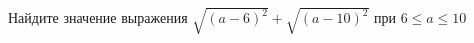 \begin{ex}
	\begin{condition}
		Найдите значение выражения \( \sqrt{(a-6)^2}+\sqrt{(a-10)^2} \) при \( 6\le a \le10 \)
	\end{condition}
\end{ex}